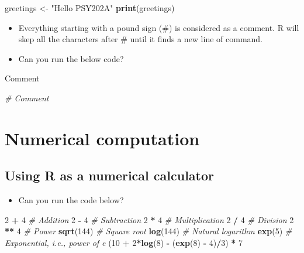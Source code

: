 \documentclass[
]{book}
\newenvironment{Shaded}{\begin{snugshade}}{\end{snugshade}}
\newcommand{\CommentTok}[1]{\textcolor[rgb]{0.56,0.35,0.01}{\textit{#1}}}
\newcommand{\DecValTok}[1]{\textcolor[rgb]{0.00,0.00,0.81}{#1}}
\newcommand{\FunctionTok}[1]{\textcolor[rgb]{0.13,0.29,0.53}{\textbf{#1}}}
\newcommand{\NormalTok}[1]{#1}
\newcommand{\OtherTok}[1]{\textcolor[rgb]{0.56,0.35,0.01}{#1}}
\newcommand{\SpecialCharTok}[1]{\textcolor[rgb]{0.81,0.36,0.00}{\textbf{#1}}}
\newcommand{\StringTok}[1]{\textcolor[rgb]{0.31,0.60,0.02}{#1}}
\providecommand{\tightlist}{%
  \setlength{\itemsep}{0pt}\setlength{\parskip}{0pt}}
\begin{document}
\begin{Shaded}
\begin{Highlighting}[]
\NormalTok{greetings }\OtherTok{\textless{}{-}} \StringTok{"Hello PSY202A"}
\FunctionTok{print}\NormalTok{(greetings)}
\end{Highlighting}
\end{Shaded}

\begin{itemize}
\item
  Everything starting with a pound sign (\#) is considered as a comment. R will skep all the characters after \# until it finds a new line of command.
\item
  Can you run the below code?
\end{itemize}

\begin{Shaded}
\begin{Highlighting}[]
\NormalTok{Comment}

\CommentTok{\# Comment}
\end{Highlighting}
\end{Shaded}

\section{Numerical computation}\label{numerical-computation}

\subsection{Using R as a numerical calculator}\label{using-r-as-a-numerical-calculator}

\begin{itemize}
\tightlist
\item
  Can you run the code below?
\end{itemize}

\begin{Shaded}
\begin{Highlighting}[]
\DecValTok{2} \SpecialCharTok{+} \DecValTok{4} \CommentTok{\# Addition}
\DecValTok{2} \SpecialCharTok{{-}} \DecValTok{4} \CommentTok{\# Subtraction}
\DecValTok{2} \SpecialCharTok{*} \DecValTok{4} \CommentTok{\# Multiplication}
\DecValTok{2} \SpecialCharTok{/} \DecValTok{4} \CommentTok{\# Division}
\DecValTok{2} \SpecialCharTok{**} \DecValTok{4} \CommentTok{\# Power}
\FunctionTok{sqrt}\NormalTok{(}\DecValTok{144}\NormalTok{) }\CommentTok{\# Square root}
\FunctionTok{log}\NormalTok{(}\DecValTok{144}\NormalTok{) }\CommentTok{\# Natural logarithm}
\FunctionTok{exp}\NormalTok{(}\DecValTok{5}\NormalTok{) }\CommentTok{\# Exponential, i.e., power of e}
\NormalTok{(}\DecValTok{10} \SpecialCharTok{+} \DecValTok{2}\SpecialCharTok{*}\FunctionTok{log}\NormalTok{(}\DecValTok{8}\NormalTok{) }\SpecialCharTok{{-}}\NormalTok{ (}\FunctionTok{exp}\NormalTok{(}\DecValTok{8}\NormalTok{) }\SpecialCharTok{{-}} \DecValTok{4}\NormalTok{)}\SpecialCharTok{/}\DecValTok{3}\NormalTok{) }\SpecialCharTok{*} \DecValTok{7}
\end{Highlighting}
\end{Shaded}
\end{document}
